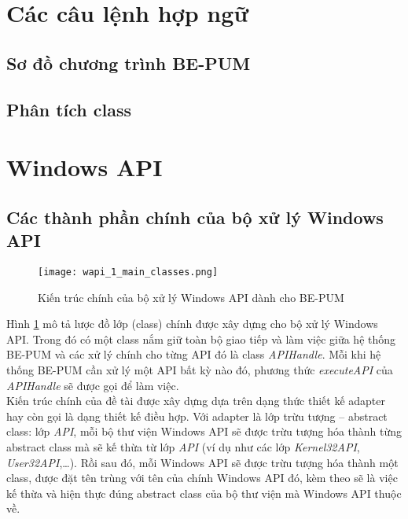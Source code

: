 \section{Các câu lệnh hợp ngữ}
	\subsection{Sơ đồ chương trình BE-PUM}
	\subsection{Phân tích class}

\newpage
\section{Windows API} \label{sec:wapi_design}

	\subsection{Các thành phần chính của bộ xử lý Windows API} \label{sec:main_classes}

	\begin{figure}[htp]
	\centering
		\texttt{[image: wapi\_1\_main\_classes.png]}
		\caption{Kiến trúc chính của bộ xử lý Windows API dành cho BE-PUM}	
		\label{fig:wapi_1_main_classes}		
	\end{figure}

Hình \ref{fig:wapi_1_main_classes} mô tả lược đồ lớp (class) chính được xây dựng cho bộ xử lý Windows API. Trong đó có một class nắm giữ toàn bộ giao tiếp và làm việc giữa hệ thống BE-PUM và các xử lý chính cho từng API đó là class \textit{APIHandle}. Mỗi khi hệ thống BE-PUM cần xử lý một API bất kỳ nào đó, phương thức \textit{executeAPI} của \textit{APIHandle} sẽ được gọi để làm việc.\\

Kiến trúc chính của đề tài được xây dựng dựa trên dạng thức thiết kế adapter hay còn gọi là dạng thiết kế điều hợp. Với adapter là lớp trừu tượng – abstract class: lớp \textit{API}, mỗi bộ thư viện Windows API sẽ được trừu tượng hóa thành từng abstract class mà sẽ kế thừa từ lớp \textit{API} (ví dụ như các lớp \textit{Kernel32API}, \textit{User32API},…). Rồi sau đó, mỗi Windows API sẽ được trừu tượng hóa thành một class, được đặt tên trùng với tên của chính Windows API đó, kèm theo sẽ là việc kế thừa và hiện thực đúng abstract class của bộ thư viện mà Windows API thuộc về.\\

